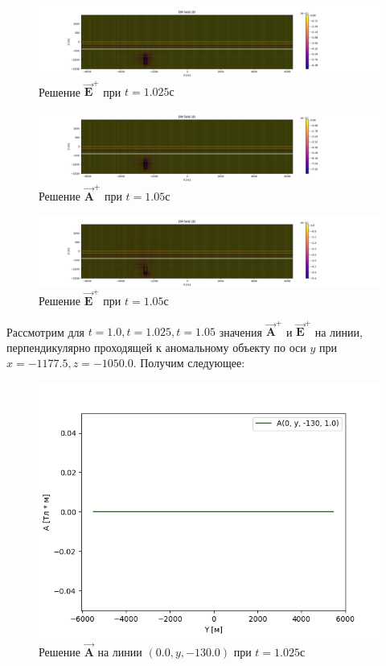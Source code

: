 \begin{figure}
	\centering
	\includegraphics[width=1.0\linewidth]{images/Answer_E_2plus_time_layer_1.0250000000000006.png}
	\caption{Решение $\overrightarrow{\textbf{E}}^+$ при $t = 1.025с$}
	\label{fig:E_2plus_t1}
\end{figure} 

\begin{figure}
	\centering
	\includegraphics[width=1.0\linewidth]{images/Answer_A_2plus_time_layer_1.05.png}
	\caption{Решение $\overrightarrow{\textbf{A}}^+$ при $t = 1.05с$}
	\label{fig:A_2plus_t2}
\end{figure} 


\begin{figure}
	\centering
	\includegraphics[width=1.0\linewidth]{images/Answer_E_2plus_time_layer_1.05.png}
	\caption{Решение $\overrightarrow{\textbf{E}}^+$ при $t = 1.05с$}
	\label{fig:E_2plus_t2}
\end{figure} 

Рассмотрим для $t = 1.0, t = 1.025, t = 1.05$ значения $\overrightarrow{\textbf{A}}^+$ и $\overrightarrow{\textbf{E}}^+$ на линии, перпендикулярно проходящей к аномальному объекту по оси $y$ при $x = -1177.5, z = -1050.0$. Получим следующее:

\begin{figure}
	\centering
	\includegraphics[width=0.5\linewidth]{images/Normal_A_obj2_1.png}
	\caption{Решение $\overrightarrow{\textbf{A}}$ на линии $(0.0, y, -130.0)$ при $t = 1.025с$}
	\label{fig:A_2line_t0}
\end{figure} 

